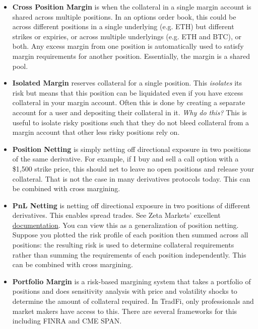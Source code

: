 \documentclass{article}
\begin{document}
\begin{itemize}
    \item \textbf{Cross Position Margin} is when the collateral in a single margin account is shared across multiple positions. In an options order book, this could be across different positions in a single underlying (e.g. ETH) but different strikes or expiries, or across multiple underlyings (e.g. ETH and BTC), or both. Any excess margin from one position is automatically used to satisfy margin requirements for another position. Essentially, the margin is a shared pool.

    \item \textbf{Isolated Margin} reserves collateral for a single position. This \textit{isolates} its risk but means that this position can be liquidated even if you have excess collateral in your margin account. Often this is done by creating a separate account for a user and depositing their collateral in it. \textit{Why do this?} This is useful to isolate risky positions such that they do not bleed collateral from a margin account that other less risky positions rely on.
    
    \item \textbf{Position Netting} is simply netting off directional exposure in two positions of the same derivative. For example, if I buy and sell a call option with a \$1,500 strike price, this should net to leave no open positions and release your collateral. That is not the case in many derivatives protocols today. This can be combined with cross margining.
    
    \item \textbf{PnL Netting} is netting off directional exposure in two positions of different derivatives. This enables spread trades. See Zeta Markets' excellent \href{https://docs.zeta.markets/zeta-protocol/trading/options-contract-specifications/spread-accounts}{documentation}. You can view this as a generalization of position netting. Suppose you plotted the risk profile of each position then summed across all positions: the resulting risk is used to determine collateral requirements rather than summing the requirements of each position independently. This can be combined with cross margining.
    
    \item \textbf{Portfolio Margin} is a risk-based margining system that takes a portfolio of positions and does sensitivity analysis with price and volatility shocks to determine the amount of collateral required. In TradFi, only professionals and market makers have access to this. There are several frameworks for this including FINRA and CME SPAN.
\end{itemize}
\end{document}
